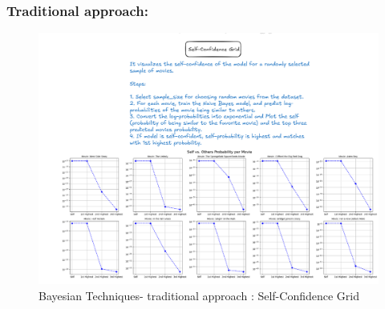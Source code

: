 \documentclass[a4paper]{article}
\theoremstyle{plain}
\begin{document}
\subsubsection{Traditional approach:}
\begin{figure}[H]
    \centering
    \includegraphics[width=\linewidth]{baytrad1.png}
    \caption{Bayesian Techniques- traditional approach : Self-Confidence Grid}
    \label{fig:cbf}
\end{figure}
\end{document}
